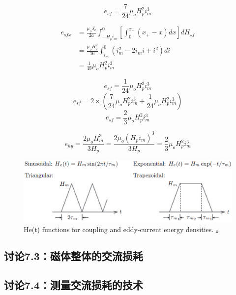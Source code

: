 \begin{equation}%
e_{sf}=\frac{7}{24}\mu_oH_{p}^{2}i_{m}^{3}
\end{equation}


\begin{align*}%
e_{sfx}&=\frac{\mu_oJ_c}{2a}\int_{-H_pi_m}^{0}\left[\int_{0}^{x_+}(x_+-x)dx\right]dH_{sf} \\
&=\frac{\mu_oH_{p}^{2}}{16}\int_{i_m}^{0}(i_{m}^{2}-2i_mi+i^2)di \\
&=\frac{1}{48}\mu_oH_{p}^{2}i_{m}^{3}
\end{align*}


\begin{equation}%
e_{sf}=\frac{1}{24}\mu_oH_{p}^{2}i_{m}^{3}
\end{equation}
\begin{equation}%
e_{sf}=2\times\left(\frac{7}{24}\mu_oH_{p}^{2}i_{m}^{3}+\frac{1}{24}\mu_oH_{p}^{2}i_{m}^{3}\right)
\end{equation}
\begin{equation}%
e_{sf}=\frac{2}{3}\mu_oH_{p}^{2}i_{m}^{3}
\end{equation}


\begin{equation}%
e_{hy}=\frac{2\mu_oH_{m}^{3}}{3H_p} 
=\frac{2\mu_o(H_pi_m)^3}{3H_p} 
=\frac{2}{3}\mu_oH_{p}^{2}i_{m}^{3}
\end{equation}

\begin{figure}[htbp]
	\centering
	\includegraphics[scale=0.7]{chpt7/figs/fig7.18.eps}
	\caption{He(t) functions for coupling and eddy-current energy densities. 。}
\end{figure}


\subsection{讨论7.3：磁体整体的交流损耗}



\subsection{讨论7.4：测量交流损耗的技术}


